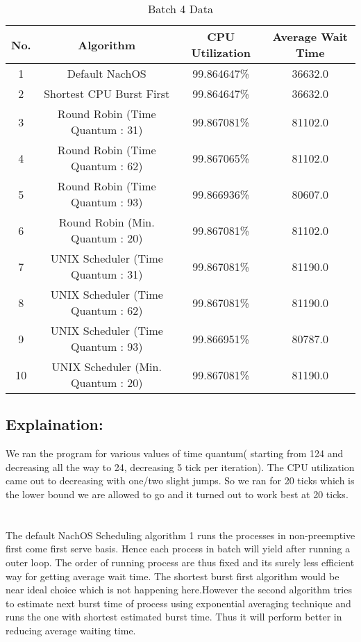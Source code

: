 \documentclass{article}
\begin{document}
	\begin{table}[!htb]
		\caption{Batch 4 Data}
		\begin{tabular}{ |c|c|c|c| }
			\hline
			\textbf{No.} & \textbf{Algorithm} & \textbf{CPU Utilization} & \textbf{Average Wait Time} \\ \hline
			1	&	Default	NachOS	&				99.864647\%	&	36632.0	\\	\hline
			2	&	Shortest	CPU	Burst	First	&		99.864647\%	&	36632.0	\\	\hline
			3	&	Round	Robin	(Time	Quantum	:	31)&	99.867081\%	&	81102.0	\\	\hline
			4	&	Round	Robin	(Time	Quantum	:	62)&	99.867065\%	&	81102.0	\\	\hline
			5	&	Round	Robin	(Time	Quantum	:	93)&	99.866936\%	&	80607.0	\\	\hline
			6	&	Round	Robin	(Min.	Quantum	:	20)&	99.867081\%	&	81102.0	\\	\hline
			7	&	UNIX	Scheduler	(Time	Quantum	:	31)&	99.867081\%	&	81190.0	\\	\hline
			8	&	UNIX	Scheduler	(Time	Quantum	:	62)&	99.867081\%	&	81190.0	\\	\hline
			9	&	UNIX	Scheduler	(Time	Quantum	:	93)&	99.866951\%	&	80787.0	\\	\hline
			10	&	UNIX	Scheduler	(Min.	Quantum	:	20)&	99.867081\%	&	81190.0	\\	\hline
			
		\end{tabular}
	
		\subsection*{Explaination: } We ran the program for various values of time quantum( starting from 124 and decreasing all the way to 24, decreasing 5 tick per iteration). The CPU utilization came out to decreasing with one/two slight jumps. So we ran for 20 ticks which is the lower bound we are allowed to go and it turned out to work best at 20 ticks. 
		
	\end{table}
	
\section*{}
	The default NachOS Scheduling algorithm 1 runs the processes in non-preemptive first come first serve basis. Hence each process in batch will yield after running a outer loop. The order of running process are thus fixed and its surely less efficient way for getting average wait time. The shortest burst first algorithm would be near ideal choice which is not happening here.However the second algorithm tries to estimate next burst time of process using exponential averaging technique and runs the one with shortest estimated burst time. Thus it will perform better in reducing average waiting time.
	 
\end{document}
